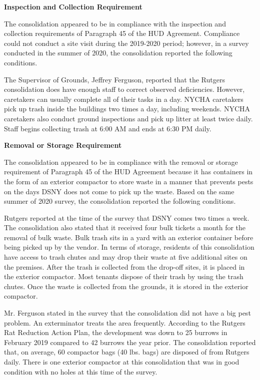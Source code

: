  

\textbf{Inspection and Collection Requirement} 

 

The consolidation appeared to be in compliance with the inspection and collection requirements of Paragraph 45 of the HUD Agreement. Compliance could not conduct a site visit during the 2019-2020 period; however, in a survey conducted in the summer of 2020, the consolidation reported the following conditions.

The Supervisor of Grounds, Jeffrey Ferguson, reported that the Rutgers consolidation does have enough staff to correct observed deficiencies. However, caretakers can usually complete all of their tasks in a day. NYCHA caretakers pick up trash inside the buildings two times a day, including weekends. NYCHA caretakers also conduct ground inspections and pick up litter at least twice daily. Staff begins collecting trash at 6:00 AM and ends at 6:30 PM daily. 

\textbf{Removal or Storage Requirement} 

The consolidation appeared to be in compliance with the removal or storage requirement of Paragraph  45 of the HUD Agreement because it has containers in the form of an exterior compactor to store waste in a manner that prevents pests on the days DSNY does not come to pick up the waste. Based on the same summer of  2020  survey, the consolidation reported the following conditions.

Rutgers reported at the time of the survey that DSNY comes two times a week. The consolidation also stated that it received four bulk tickets a month for the removal of bulk waste.  Bulk trash sits in a yard with an exterior container before being picked up by the vendor.  In terms of storage, residents of this consolidation have access to trash chutes and may drop their waste at five additional sites on the premises. After the trash is collected from the drop-off sites, it is placed in the exterior compactor. Most tenants dispose of their trash by using the trash chutes. Once the waste is collected from the grounds, it is stored in the exterior compactor.  

 

Mr. Ferguson stated in the survey that the consolidation did not have a big pest problem. An exterminator treats the area frequently. According to the Rutgers Rat Reduction Action Plan, the development was down to 25 burrows in February 2019 compared to 42 burrows the year prior. The consolidation reported that, on average, 60 compactor bags (40 lbs. bags)  are disposed of from Rutgers daily. There is one exterior compactor at this consolidation that was in good condition with no holes at this time of the survey.

